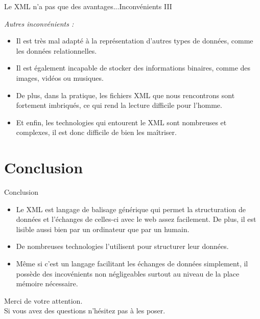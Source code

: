 \documentclass{beamer}
\begin{document}
        \begin{frame}{Le XML n'a pas que des avantages...}{Inconvénients III}
      \begin{block}{\textit{Autres inconvénients :}}
              \begin{itemize}
                \item{
Il est très mal adapté à la représentation d'autres types de données, comme les données relationnelles.
                  }\pause
                  \item{
Il est également incapable de stocker des informations binaires, comme des images, vidéos ou musiques.
                  }\pause
                  \item{
De plus, dans la pratique, les fichiers XML que nous rencontrons sont fortement imbriqués, ce qui rend la lecture difficile pour l'homme.
                  }\pause
                  \item{
Et enfin, les technologies qui entourent le XML sont nombreuses et complexes, il est donc difficile de bien les maîtriser.

                  }
                \end{itemize}
        \end{block}
    \end{frame}
    
\section{Conclusion}    
    \begin{frame}{Conclusion}
        \begin{itemize}
            \item{
Le XML est langage de balisage générique qui permet la structuration de données et l'échanges de celles-ci avec le web assez facilement. De plus, il est lisible aussi bien par un ordinateur que par un humain.
            }\pause
            \item{
De nombreuses technologies l'utilisent pour structurer leur données.
            }\pause
            \item{
Même si c'est un langage facilitant les échanges de données simplement, il possède des incovénients non négligeables surtout au niveau de la place mémoire nécessaire.
            }
        \end{itemize}
    \end{frame}
    
    \begin{frame}
    \begin{center}
\huge{
      Merci de votre attention.
  }\\
  \Large{
  Si vous avez des questions n'hésitez pas à les poser. 
  }
  \end{center}
\end{frame}
\end{document}

